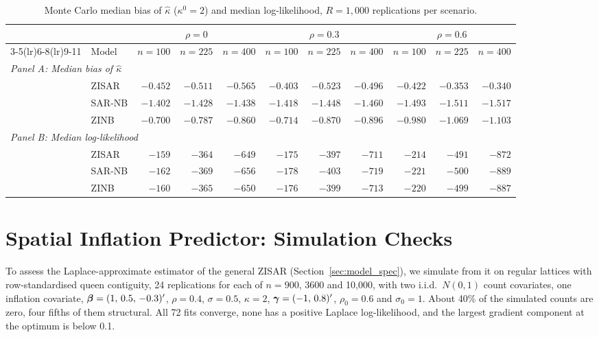 \begin{table}[htbp]
\centering
\caption{Monte Carlo median bias of $\hat{\kappa}$ ($\kappa^0=2$) and median log-likelihood, $R=1{,}000$ replications per scenario.}\label{tab:mc_kappa}
\footnotesize
\setlength{\tabcolsep}{4pt}
\begin{tabular}{ll rrr rrr rrr}
\toprule
& & \multicolumn{3}{c}{$\rho=0$} & \multicolumn{3}{c}{$\rho=0.3$} & \multicolumn{3}{c}{$\rho=0.6$} \\
\cmidrule(lr){3-5}\cmidrule(lr){6-8}\cmidrule(lr){9-11}
& Model & $n{=}100$ & $n{=}225$ & $n{=}400$ & $n{=}100$ & $n{=}225$ & $n{=}400$ & $n{=}100$ & $n{=}225$ & $n{=}400$ \\
\midrule
\multicolumn{11}{l}{\emph{Panel A: Median bias of $\hat{\kappa}$}} \\[3pt]
  & ZISAR    & $-0.452$ & $-0.511$ & $-0.565$ & $-0.403$ & $-0.523$ & $-0.496$ & $-0.422$ & $-0.353$ & $-0.340$ \\
  & SAR-NB   & $-1.402$ & $-1.428$ & $-1.438$ & $-1.418$ & $-1.448$ & $-1.460$ & $-1.493$ & $-1.511$ & $-1.517$ \\
  & ZINB     & $-0.700$ & $-0.787$ & $-0.860$ & $-0.714$ & $-0.870$ & $-0.896$ & $-0.980$ & $-1.069$ & $-1.103$ \\
\midrule
\multicolumn{11}{l}{\emph{Panel B: Median log-likelihood}} \\[3pt]
  & ZISAR    & $-159$ & $-364$ & $-649$ & $-175$ & $-397$ & $-711$ & $-214$ & $-491$ & $-872$ \\
  & SAR-NB   & $-162$ & $-369$ & $-656$ & $-178$ & $-403$ & $-719$ & $-221$ & $-500$ & $-889$ \\
  & ZINB     & $-160$ & $-365$ & $-650$ & $-176$ & $-399$ & $-713$ & $-220$ & $-499$ & $-887$ \\
\bottomrule
\end{tabular}
\end{table}

\clearpage

\section{Spatial Inflation Predictor: Simulation Checks}\label{app:general}

To assess the Laplace-approximate estimator of the general ZISAR (Section~\ref{sec:model_spec}), we simulate from it on regular lattices with row-standardised queen contiguity, 24 replications for each of $n = 900$, 3600 and 10{,}000, with two i.i.d.\ $N(0,1)$ count covariates, one inflation covariate, $\boldsymbol{\beta} = (1,\, 0.5,\, -0.3)'$, $\rho = 0.4$, $\sigma = 0.5$, $\kappa = 2$, $\boldsymbol{\gamma} = (-1,\, 0.8)'$, $\rho_0 = 0.6$ and $\sigma_0 = 1$.
About 40\% of the simulated counts are zero, four fifths of them structural.
All 72 fits converge, none has a positive Laplace log-likelihood, and the largest gradient component at the optimum is below 0.1.

